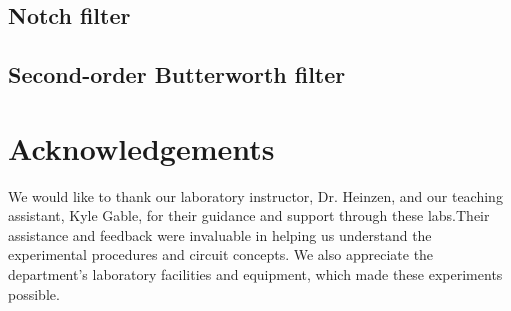 \documentclass{article}
\begin{document}
\subsection{Notch filter}


\subsection{Second-order Butterworth filter}


\section*{Acknowledgements}

We would like to thank our laboratory instructor, Dr. Heinzen, and our teaching 
assistant, Kyle Gable, for their guidance and support through these labs.Their 
assistance and feedback were invaluable in helping us understand the experimental 
procedures and circuit concepts. We also appreciate the department's laboratory 
facilities and equipment, which made these experiments possible.
\end{document}

